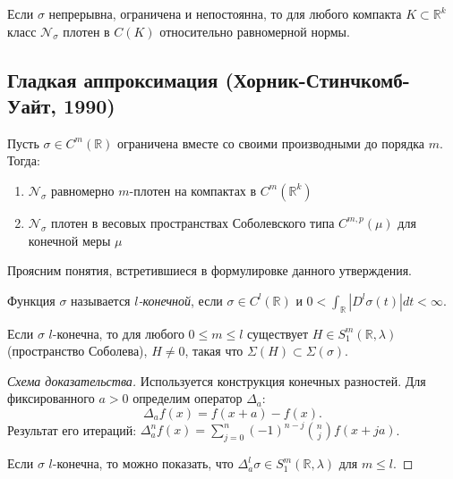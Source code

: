 \documentclass[../NDCNNAI_main.tex]{subfiles}
\begin{document}
\begin{corollary}
Если $\sigma$ непрерывна, ограничена и непостоянна, то для любого компакта $K \subset \mathbb{R}^k$ класс $\mathcal{N}_\sigma$ плотен в $C(K)$ относительно равномерной нормы.
\end{corollary}

\subsection{Гладкая аппроксимация (Хорник-Стинчкомб-Уайт, 1990)}

\begin{theorem}
Пусть $\sigma \in C^m(\mathbb{R})$ ограничена вместе со своими производными до порядка $m$. Тогда:
\begin{enumerate}
    \item $\mathcal{N}_\sigma$ равномерно $m$-плотен на компактах в $C^m(\mathbb{R}^k)$
    \item $\mathcal{N}_\sigma$ плотен в весовых пространствах Соболевского типа $C^{m,p}(\mu)$ для конечной меры $\mu$
\end{enumerate}
\end{theorem}
Проясним понятия, встретившиеся в формулировке данного утверждения.

\begin{definition}
Функция $\sigma$ называется \emph{$l$-конечной}, если $\sigma \in C^l(\mathbb{R})$ и $0 < \int_{\mathbb{R}} |D^l \sigma(t)| dt < \infty$.
\end{definition}

\begin{lemma}
Если $\sigma$ $l$-конечна, то для любого $0 \leq m \leq l$ существует $H \in S^m_1(\mathbb{R}, \lambda)$ (пространство Соболева), $H \neq 0$, такая что $\Sigma(H) \subset \Sigma(\sigma)$.
\end{lemma}

\begin{proof}[Схема доказательства]
Используется конструкция конечных разностей. Для фиксированного $a > 0$ определим оператор $\Delta_a$:
\[
\Delta_a f(x) = f(x+a) - f(x).
\]
Результат его итераций: $\Delta_a^n f(x) = \sum_{j=0}^n (-1)^{n-j} \binom{n}{j} f(x + ja)$.

Если $\sigma$ $l$-конечна, то можно показать, что $\Delta_a^l \sigma \in S^m_1(\mathbb{R}, \lambda)$ для $m \leq l$.
\end{proof}
\end{document}
